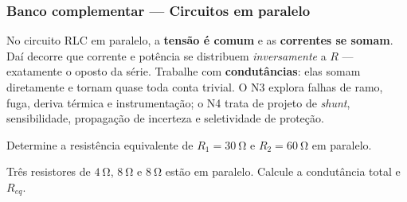
\subsubsection*{Banco complementar --- Circuitos em paralelo}

\begin{atencao}
No circuito RLC em paralelo, a \textbf{tensão é comum} e as \textbf{correntes se somam}. Daí
decorre que corrente e potência se distribuem \emph{inversamente} a $R$ ---
exatamente o oposto da série. Trabalhe com \textbf{condutâncias}: elas somam
diretamente e tornam quase toda conta trivial. O N3 explora falhas de ramo,
fuga, deriva térmica e instrumentação; o N4 trata de projeto de \emph{shunt},
sensibilidade, propagação de incerteza e seletividade de proteção.
\end{atencao}

\blocofixacao

\begin{questao}[1]{}
Determine a resistência equivalente de $R_1=\SI{30}{\ohm}$ e
$R_2=\SI{60}{\ohm}$ em paralelo.
\end{questao}

\begin{questao}[1]{}
Três resistores de $\SI{4}{\ohm}$, $\SI{8}{\ohm}$ e $\SI{8}{\ohm}$ estão em
paralelo. Calcule a condutância total e $R_{eq}$.
\end{questao}

